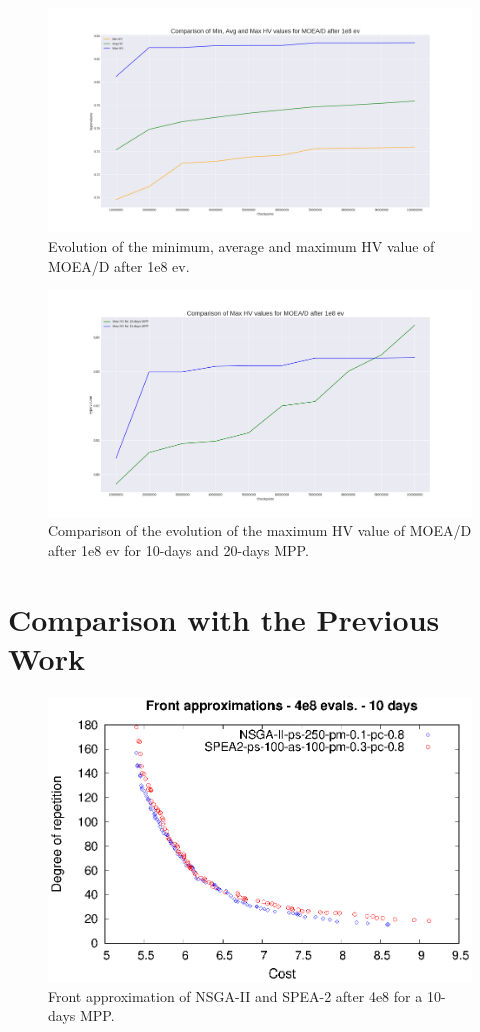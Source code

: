 \begin{figure}[!h]
\centering
\includegraphics[scale=0.35]{../experiments/plots/minHV_avgHV_maxHV_evolution_10_days.png}
\caption{Evolution of the minimum, average and maximum HV value of MOEA/D after 1e8 ev.}
\label{fig:average}
\end{figure}

\begin{figure}[!h]
\centering
\includegraphics[scale=0.35]{../experiments/plots/maxHV_evolution_10_vs_20_days.png}
\caption{Comparison of the evolution of the maximum HV value of MOEA/D after 1e8 ev for 10-days and 20-days MPP.}
\label{fig:comare}
\end{figure}

\newpage
\section{Comparison with the Previous Work}

\begin{figure}[!h]
\centering
\includegraphics[scale=1.2]{../references/fronts_10days.eps}
\caption{Front approximation of NSGA-II and SPEA-2 after 4e8 for a 10-days MPP.}
\label{fig:front_main}
\end{figure}

